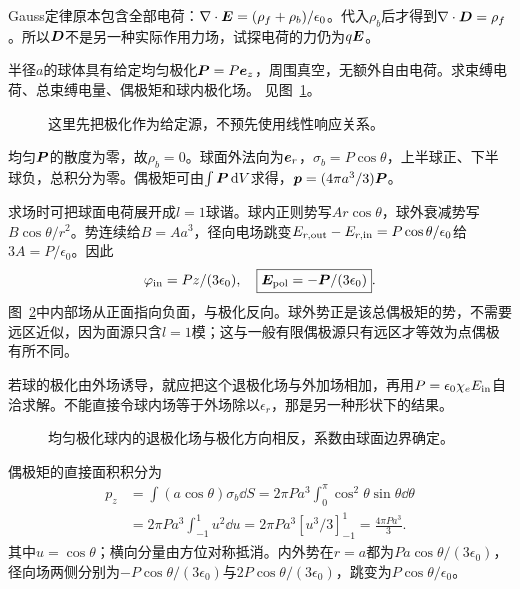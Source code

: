 Gauss定律原本包含全部电荷：$\nabla\cdot\bm{E}=(\rho_f+\rho_b)/\epsilon_0$。代入$\rho_b$后才得到$\nabla\cdot\bm{D}=\rho_f$。所以$\bm{D}$不是另一种实际作用力场，试探电荷的力仍为$q\bm{E}$。

\begin{example}[均匀极化球的电荷与内场]\label{ex:es4-e1}
半径$a$的球体具有给定均匀极化$\bm{P}=P\bm{e}_z$，周围真空，无额外自由电荷。求束缚电荷、总束缚电量、偶极矩和球内极化场。 见图~\ref{fig:es4-e1-q}。
\end{example}

\begin{figure}[H]\centering
{}
\caption{这里先把极化作为给定源，不预先使用线性响应关系。}\label{fig:es4-e1-q}
\end{figure}
\begin{solution}
均匀$\bm{P}$的散度为零，故$\rho_b=0$。球面外法向为$\bm{e}_r$，$\sigma_b=P\cos\theta$，上半球正、下半球负，总积分为零。偶极矩可由$\int\bm{P}\mathop{}\!\mathrm d V$求得，$\bm{p}=(4\pi a^3/3)\bm{P}$。

求场时可把球面电荷展开成$l=1$球谐。球内正则势写$Ar\cos\theta$，球外衰减势写$B\cos\theta/r^2$。势连续给$B=Aa^3$，径向电场跳变$E_{r,\rm out}-E_{r,\rm in}=P\cos\theta/\epsilon_0$给$3A=P/\epsilon_0$。因此
\[\varphi_{\rm in}=Pz/(3\epsilon_0),\quad \boxed{\bm{E}_{\rm pol}=-\bm{P}/(3\epsilon_0)}.
\]
图~\ref{fig:es4-e1-s}中内部场从正面指向负面，与极化反向。球外势正是该总偶极矩的势，不需要远区近似，因为面源只含$l=1$模；这与一般有限偶极源只有远区才等效为点偶极有所不同。

若球的极化由外场诱导，就应把这个退极化场与外加场相加，再用$P=\epsilon_0\chi_eE_{\rm in}$自洽求解。不能直接令球内场等于外场除以$\epsilon_r$，那是另一种形状下的结果。
\begin{figure}[H]\centering
{}
\caption{均匀极化球内的退极化场与极化方向相反，系数由球面边界确定。}\label{fig:es4-e1-s}
\end{figure}


偶极矩的直接面积积分为
\[\begin{aligned}
p_z&=\int(a\cos\theta)\sigma_b\dd S
=2\pi Pa^3\int_0^\pi\cos^2\theta\sin\theta\dd\theta\\
&=2\pi Pa^3\int_{-1}^1u^2\dd u
=2\pi Pa^3[u^3/3]_{-1}^1=\frac{4\pi Pa^3}3.
\end{aligned}\]
其中$u=\cos\theta$；横向分量由方位对称抵消。内外势在$r=a$都为$Pa\cos\theta/(3\epsilon_0)$，径向场两侧分别为$-P\cos\theta/(3\epsilon_0)$与$2P\cos\theta/(3\epsilon_0)$，跳变为$P\cos\theta/\epsilon_0$。
\end{solution}

